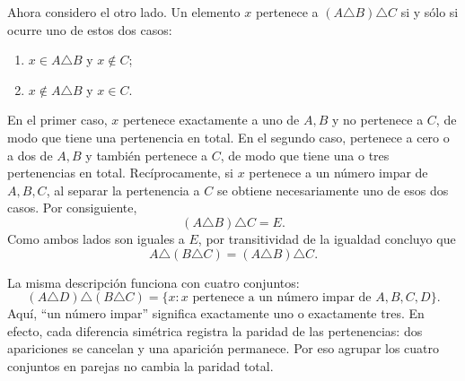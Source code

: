 \documentclass[11pt]{article}
\begin{document}
Ahora considero el otro lado. Un elemento $x$ pertenece a
$(A\triangle B)\triangle C$ si y sólo si ocurre uno de estos dos casos:
\begin{enumerate}
  \item $x\in A\triangle B$ y $x\notin C$;
  \item $x\notin A\triangle B$ y $x\in C$.
\end{enumerate}
En el primer caso, $x$ pertenece exactamente a uno de $A,B$ y no pertenece a
$C$, de modo que tiene una pertenencia en total. En el segundo caso, pertenece
a cero o a dos de $A,B$ y también pertenece a $C$, de modo que tiene una o tres
pertenencias en total. Recíprocamente, si $x$ pertenece a un número impar de
$A,B,C$, al separar la pertenencia a $C$ se obtiene necesariamente uno de esos
dos casos. Por consiguiente,
\[
(A\triangle B)\triangle C=E.
\]
Como ambos lados son iguales a $E$, por transitividad de la igualdad concluyo
que
\[
A\triangle(B\triangle C)=(A\triangle B)\triangle C.
\]

La misma descripción funciona con cuatro conjuntos:
\[
\boxed{(A\triangle D)\triangle(B\triangle C)
=\{x:x\text{ pertenece a un número impar de }A,B,C,D\}}.
\]
Aquí, ``un número impar'' significa exactamente uno o exactamente tres.
En efecto, cada diferencia simétrica registra la paridad de las pertenencias:
dos apariciones se cancelan y una aparición permanece. Por eso agrupar los
cuatro conjuntos en parejas no cambia la paridad total.
\end{document}
